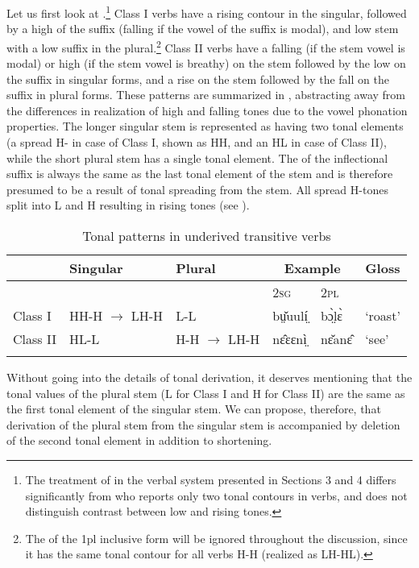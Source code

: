 \documentclass[output=paper,newtxmath,modfonts,nonflat,draftmode]{langsci/langscibook}
\begin{document}
Let us first look at .\footnote{The\label{fn:monich:6} treatment of  in the verbal system presented in Sections 3 and 4 differs significantly from \citet{gjersøe2017} who reports only two tonal contours in verbs, and does not distinguish contrast between low and rising tones.} Class I verbs have a rising contour in the singular, followed by a high  of the suffix (falling if the vowel of the suffix is modal), and low stem with a low suffix in the plural.\footnote{The \label{fn:monich:7} of the 1pl inclusive form will be ignored throughout the discussion, since it has the same tonal contour for all verbs H-H (realized as LH-HL).} Class II verbs have a falling  (if the stem vowel is modal) or high (if the stem vowel is breathy)  on the stem followed by the low  on the suffix in singular forms, and a rise on the stem followed by the fall on the suffix in plural forms. These patterns are summarized in , abstracting away from the differences in realization of high and falling tones due to the vowel phonation properties. The longer singular stem is represented as having two tonal elements (a spread H- in case of Class I, shown as HH, and an HL in case of Class II), while the short plural stem has a single tonal element. The  of the inflectional suffix is always the same as the last tonal element of the stem and is therefore presumed to be a result of tonal spreading from the stem. All spread H-tones split into L and H resulting in rising tones (see ). 



\begin{table}[t]
\begin{tabularx}{\textwidth}{llXlll}
\lsptoprule
 & Singular & Plural & \multicolumn{2}{c}{Example} & Gloss\\
\midrule
&  &  & \scshape 2sg &  {\scshape 2pl} & \\
Class I & HH-H $\rightarrow$ LH-H & L-L & bṳ̌uulí̤ & bɔ̤̀lɛ̀ & ‘roast’\\
Class II & HL-L & H-H $\rightarrow$ LH-H & nɛ̂ɛɛnì̤ & nɛ̌anɛ̂ & ‘see’\\
\lspbottomrule
\end{tabularx}
\caption{Tonal patterns in underived transitive verbs}
\label{tab:monich:7}
\end{table}

Without going into the details of tonal derivation, it deserves mentioning that the tonal values of the plural stem (L for Class I and H for Class II) are the same as the first tonal element of the singular stem. We can propose, therefore, that derivation of the plural stem from the singular stem is accompanied by deletion of the second tonal element in addition to shortening.
\end{document}
